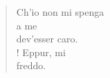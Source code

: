 

\begin{verse}
    Ch'io non mi spenga\\
    a me\\
    dev'esser caro.\\!
    Eppur, mi\\
    freddo.
\end{verse}

